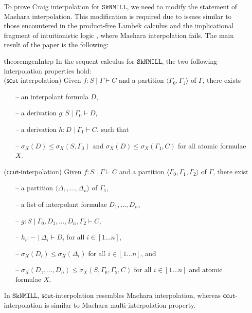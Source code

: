 \documentclass[sn-mathphys-num]{sn-jnl}%
\newcommand{\GG}{\Gamma}
\newcommand{\GD}{\Delta}
\newcommand{\vd}{\vdash}
\newcommand{\SkNMILL}{$\mathtt{SkNMILL}$}
\newcommand{\mf}[1]{\mathsf{#1}}
\newcommand{\gs}[1]{\sigma_{X} (#1)}
\theoremstyle{thmstyleone}%
\theoremstyle{thmstyletwo}%
\theoremstyle{thmstylethree}%
\begin{document}
To prove Craig interpolation for \SkNMILL, we need to modify the statement of Maehara interpolation.
This modification is required due to issues similar to those encountered in the product-free Lambek calculus \cite{Pentus1997} and the implicational fragment of intuitionistic logic \cite{Kanazawa2006}, where Maehara interpolation fails. The main result of the paper is the following:
\begin{restatable*}{theorem}{genIntrp}\label{genIntrp}
In the sequent calculus for \SkNMILL, the two following interpolation properties hold:
\\
($\mf{scut}$-interpolation) Given $f: S \mid \Gamma \vd C$ and a partition $\langle \GG_0,\GG_1 \rangle$ of $\GG$, there exists  
\begin{itemize}
  \item[--] an interpolant formula $D$,
  \item[--] a derivation $g : S \mid \GG_0 \vd D$,
  \item[--] a derivation $h : D \mid \GG_1 \vd C$, such that
  \item[--] $\gs{D} \leq \gs{S , \GG_0}$ and $\gs{D} \leq \gs{\GG_1 , C}$ for all atomic formulae $X$.
\end{itemize}
  ($\mf{ccut}$-interpolation) Given $f: S \mid \Gamma \vd C$ and a partition $\langle \GG_0,\GG_1, \GG_2 \rangle$ of $\GG$, there exist  
  \begin{itemize}
    \item[--] a partition $\langle \GD_1, \dots, \GD_n \rangle$ of $\GG_1$,
    \item[--] a list of interpolant formulae $D_1, \dots, D_n$,
    \item[--] $g: S \mid \GG_0, D_1, \dots, D_n, \GG_2 \vd C$,
    \item[--] $h_i : {-} \mid \GD_i \vd D_i$ for  all $i \in [1\dots n]$,
    \item[--] $\gs{D_i} \leq \gs{\GD_i}$ for all $i \in [1 \dots n]$, and
    \item[--] $\gs{D_1, \dots, D_n} \leq \gs{S, \GG_0, \GG_2, C}$ for all $i \in [1 \dots n]$ and atomic formulae $X$.
  \end{itemize}
\end{restatable*}
In \SkNMILL, $\mf{scut}$-interpolation resembles Maehara interpolation, whereas $\mf{ccut}$-interpolation is similar to Maehara multi-interpolation property. %
\end{document}
